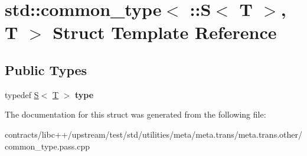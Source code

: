 \hypertarget{structstd_1_1common__type_3_01_1_1_s_3_01_t_01_4_00_01_t_01_4}{}\section{std\+:\+:common\+\_\+type$<$ \+:\+:S$<$ T $>$, T $>$ Struct Template Reference}
\label{structstd_1_1common__type_3_01_1_1_s_3_01_t_01_4_00_01_t_01_4}
\subsection*{Public Types}
\begin{DoxyCompactItemize}
\item 
\mbox{\label{structstd_1_1common__type_3_01_1_1_s_3_01_t_01_4_00_01_t_01_4_abb5e3db06d5710dc6a07de7b7b93014e}} 
typedef \mbox{\hyperlink{struct_s}{S}}$<$ \mbox{\hyperlink{struct_t}{T}} $>$ {\bfseries type}
\end{DoxyCompactItemize}


The documentation for this struct was generated from the following file\+:\begin{DoxyCompactItemize}
\item 
contracts/libc++/upstream/test/std/utilities/meta/meta.\+trans/meta.\+trans.\+other/common\+\_\+type.\+pass.\+cpp\end{DoxyCompactItemize}
